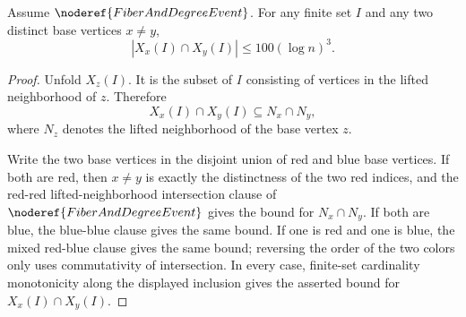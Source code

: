 \begin{helper}
Assume \(\noderef{FiberAndDegreeEvent}\).  For any finite set \(I\) and any
two distinct base vertices \(x\ne y\),
\[
|X_x(I)\cap X_y(I)|\le 100(\log n)^3.
\]
\end{helper}
\begin{proof}
Unfold \(X_z(I)\).  It is the subset of \(I\) consisting of vertices in the
lifted neighborhood of \(z\).  Therefore
\[
X_x(I)\cap X_y(I)\subseteq N_x\cap N_y,
\]
where \(N_z\) denotes the lifted neighborhood of the base vertex \(z\).

Write the two base vertices in the disjoint union of red and blue base
vertices.  If both are red, then \(x\ne y\) is exactly the distinctness of the
two red indices, and the red-red lifted-neighborhood intersection clause of
\(\noderef{FiberAndDegreeEvent}\) gives the bound for \(N_x\cap N_y\).  If
both are blue, the blue-blue clause gives the same bound.  If one is red and
one is blue, the mixed red-blue clause gives the same bound; reversing the
order of the two colors only uses commutativity of intersection.  In every
case, finite-set cardinality monotonicity along the displayed inclusion gives
the asserted bound for \(X_x(I)\cap X_y(I)\).
\end{proof}
